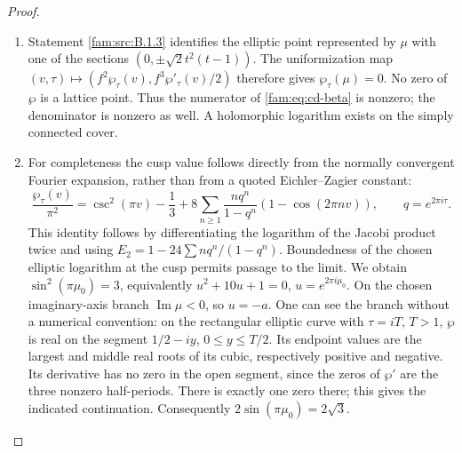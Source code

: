 \begin{proof}
\begin{enumerate}[label=\arabic*.,leftmargin=*]
\item Statement \ref{fam:src:B.1.3} identifies the elliptic point represented by \(\mu\) with
one of the sections \((0,\pm\sqrt2t^2(t-1))\). The uniformization map
\((v,\tau)\mapsto(f^2\wp_\tau(v),f^3\wp'_\tau(v)/2)\) therefore gives
\(\wp_\tau(\mu)=0\). No zero of \(\wp\) is a lattice point. Thus the numerator
of \eqref{fam:eq:cd-beta} is nonzero; the denominator is nonzero as well.
A holomorphic logarithm exists on the simply connected cover.

\item For completeness the cusp value follows directly from the normally
convergent Fourier expansion, rather than from a quoted Eichler--Zagier
constant:
\begin{equation}\label{fam:eq:cd-wp}
 \frac{\wp_\tau(v)}{\pi^2}
 =\csc^2(\pi v)-\frac13+
 8\sum_{n\geq1}\frac{nq^n}{1-q^n}(1-\cos(2\pi nv)),
 \qquad q=e^{2\pi i\tau}.
\end{equation}
This identity follows by differentiating the logarithm of the Jacobi
product twice and using
\(E_2=1-24\sum nq^n/(1-q^n)\). Boundedness of the chosen elliptic logarithm
at the cusp permits passage to the limit. We obtain
\(\sin^2(\pi\mu_0)=3\), equivalently
\(u^2+10u+1=0\), \(u=e^{2\pi i\mu_0}\).
On the chosen imaginary-axis branch \(\operatorname{Im}\mu<0\), so \(u=-a\).
One can see the branch without a numerical convention: on the rectangular
elliptic curve with \(\tau=iT\), \(T>1\), \(\wp\) is real on the segment
\(1/2-iy\), \(0\leq y\leq T/2\). Its endpoint values are the largest and
middle real roots of its cubic, respectively positive and negative.
Its derivative has no zero in the open segment, since the zeros of
\(\wp'\) are the three nonzero half-periods. There is exactly one zero
there; this gives the indicated continuation. Consequently
\(2\sin(\pi\mu_0)=2\sqrt3\).


\end{enumerate}
\end{proof}

